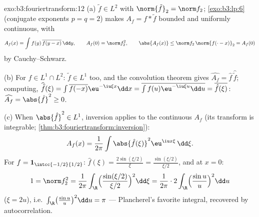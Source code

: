 \begin{solution}{exo:b3:fouriertransform:12}
(a) $\tilde f \in L^2$ with $\norm{\tilde f}_2 = \norm f_2$;
\cref{exo:b3:lp:6} (conjugate exponents $p = q = 2$) makes
$A_f = f * \tilde f$ bounded and uniformly continuous, with
\[
A_f(x) = \int f(y)\,\overline{f(y - x)}\,\dd y,
\qquad A_f(0) = \norm f_2^2,
\qquad \abs{A_f(x)} \leq \norm f_2\,\norm{f(\cdot -
x)}_2 = A_f(0)
\]
by Cauchy--Schwarz.

(b) For $f \in L^1\cap L^2$: $\tilde f \in L^1$ too, and the
convolution theorem gives $\widehat{A_f} = \hat f\,
\widehat{\tilde f}$; computing, $\widehat{\tilde f}(\xi) =
\int\overline{f(-x)}\eu^{-\iu\xi x}\dd x =
\overline{\int f(u)\eu^{-\iu\xi u}\dd u} =
\overline{\hat f(\xi)}$: $\widehat{A_f} = \abs{\hat f}^2
\geq 0$.

(c) When $\abs{\hat f}^2 \in L^1$, inversion applies to the
continuous $A_f$ (its transform is integrable;
\cref{thm:b3:fouriertransform:inversion}):
\[
A_f(x) = \frac1{2\pi}\int\abs{\hat f(\xi)}^2
\eu^{\iu x\xi}\,\dd\xi .
\]
For $f = \mathbf 1_{\intcc{-1/2}{1/2}}$: $\hat f(\xi) =
\frac{2\sin(\xi/2)}\xi = \frac{\sin(\xi/2)}{\xi/2}$, and at
$x = 0$:
\[
1 = \norm f_2^2 = \frac1{2\pi}\int_\R
\Bigl(\frac{\sin(\xi/2)}{\xi/2}\Bigr)^2\dd\xi
= \frac1{2\pi}\cdot2\int_\R\Bigl(\frac{\sin u}u\Bigr)^2\dd u
\]
($\xi = 2u$), i.e.\ $\int_\R\bigl(\frac{\sin u}u\bigr)^2\dd
u = \pi$ --- Plancherel's favorite integral, recovered by
autocorrelation.
\end{solution}

